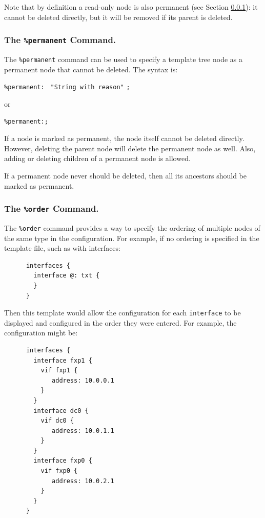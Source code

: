 \documentclass[11pt]{article}
\begin{document}
Note that by definition a read-only node is also permanent
(see Section \ref{sec:permanent-command}):
it cannot be deleted directly, but it will be removed if its
parent is deleted.

\subsubsection{The {\tt \%permanent} Command.}
\label{sec:permanent-command}

The {\tt \%permanent} command can be used to specify a template tree
node as a permanent node that cannot be deleted.
The syntax is:

\texttt{\%permanent: } \texttt{"String with reason"} \texttt{;}

or

\texttt{\%permanent:;}

If a node is marked as permanent, the node itself cannot be deleted
directly. However, deleting the parent node will delete the permanent
node as well. Also, adding or deleting children of a permanent node
is allowed.

If a permanent node never should be deleted, then all its ancestors
should be marked as permanent.

\subsubsection{The {\tt \%order} Command.}

The {\tt \%order} command provides a way to specify the ordering of
multiple nodes of the same type in the configuration.  For example, if
no ordering is specified in the template file, such as with interfaces:

\begin{verbatim}
      interfaces {
        interface @: txt {
        }
      }
\end{verbatim}

\noindent Then this template would allow the configuration for each
{\tt interface} to be displayed and configured in the order they were
entered.  For example, the configuration might be:

\begin{verbatim}
      interfaces {
        interface fxp1 {
          vif fxp1 {
             address: 10.0.0.1
          }
        }
        interface dc0 {
          vif dc0 {
             address: 10.0.1.1
          }
        }
        interface fxp0 {
          vif fxp0 {
             address: 10.0.2.1
          }
        }
      }
\end{verbatim}
\end{document}
